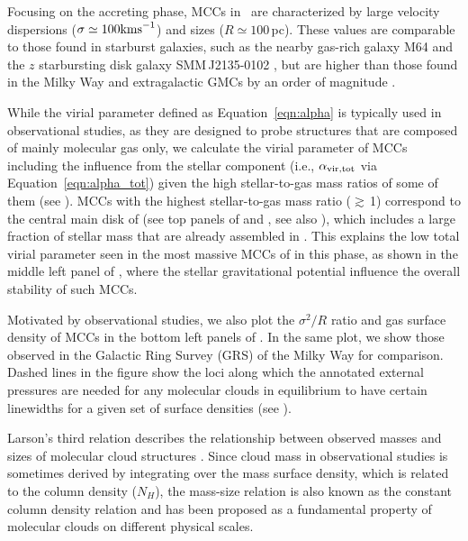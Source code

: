\IfFileExists{emulateapjlegacy.cls}{\documentclass[iop]{emulateapjlegacy}}{\documentclass[iop]{emulateapj}}
\begin{document}
Focusing on the accreting phase, MCCs in \flower\ are characterized by large velocity dispersions ($\sigma \simeq 100 {\rm km s}^{-1}$) 
and sizes ($R\simeq 100$\,pc). These values are comparable to those found in starburst galaxies, 
such as the nearby gas-rich galaxy M64 and 
the $z$ starbursting disk galaxy SMM\,J2135-0102 %
\citep{Rosolowsky05a, Swinbank11a}, but are higher than those found in the Milky Way and extragalactic GMCs by an order of magnitude \citep{Heyer04a, Bolatto08a}.

While the virial parameter defined as Equation~\ref{eqn:alpha} is typically used in observational studies, as they are designed to probe structures that are 
composed of mainly molecular gas only, we calculate the virial parameter of MCCs including the influence from the stellar component 
(i.e., $\alpha_{\rm vir, tot}$ via Equation~\ref{eqn:alpha_tot}) given the high stellar-to-gas mass ratios of 
some of them (see ). 
MCCs with the highest stellar-to-gas mass ratio ($\gtrsim$\,1) correspond to the central main disk of \flower (see top panels of 
 and , see also ), which includes a large fraction of stellar mass that are already assembled in \flower. 
This explains the low total virial parameter seen in the most massive MCCs of \flower in this phase, as shown in
the middle left panel of , where the stellar gravitational potential influence the overall stability of such MCCs.

Motivated by observational studies, we also plot the $\sigma^2/R$ ratio and gas surface density of MCCs in the bottom left panels of .
In the same plot, we show those observed in the Galactic Ring Survey (GRS) of the Milky Way \citep{Heyer09a} for comparison.
Dashed lines in the figure show the loci along which the annotated external pressures are needed for any molecular clouds in equilibrium 
to have certain linewidths for a given set of surface densities (see ).


Larson's third relation describes the relationship between observed masses and sizes of molecular cloud structures
\citep{Larson81a, McKee07a}.
Since cloud mass in observational studies is sometimes derived by integrating over the mass surface density, 
which is related to the column density ($N_H$), %
the mass-size relation is also known as the constant column density relation and has been 
proposed as a fundamental property of molecular clouds on different physical scales. 
\end{document}
